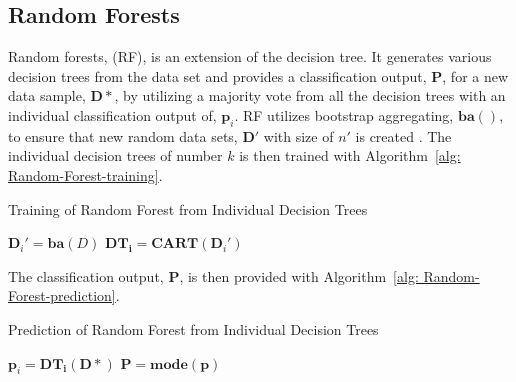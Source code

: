 \subsection{Random Forests}
Random forests, (RF), is an extension of the decision tree. It generates various decision trees from the data set and provides a classification output, $\mathbf{P}$, for a new data sample, $\mathbf{D}*$, by utilizing a majority vote from all the decision trees with an individual classification output of, $\mathbf{p}_i$. RF utilizes bootstrap aggregating, $\mathbf{ba}()$, to ensure that new random data sets, $\mathbf{D}'$ with size of $n'$ is created \cite{Primartha2018, Paul2018, Shi2006}. The individual decision trees of number $k$ is then trained with Algorithm~\ref{alg: Random-Forest-training}.

\begin{algorithm}[!htb]
	\caption[Random Forest]{Training of Random Forest from Individual Decision Trees}
	\label{alg: Random-Forest-training}
	\begin{algorithmic}[1]
		\State \texttt{$\mathbf{D}_i' = \mathbf{ba}(D)$}
		\State \texttt{$\mathbf{DT_i} = \mathbf{CART}(\mathbf{D}_i')$}
		\EndFor
	\end{algorithmic}
\end{algorithm}
The classification output, $\mathbf{P}$, is then provided with Algorithm~\ref{alg: Random-Forest-prediction}.
\begin{algorithm}[!htb]
	\caption[Random Forest]{Prediction of Random Forest from Individual Decision Trees}
	\label{alg: Random-Forest-prediction}
	\begin{algorithmic}[1]
	\State \texttt{$\mathbf{p}_i = \mathbf{DT_i}(\mathbf{D}*)$}
	\EndFor
	\State $\mathbf{P} = \textbf{mode}(\mathbf{p})$
	\end{algorithmic}
\end{algorithm}


